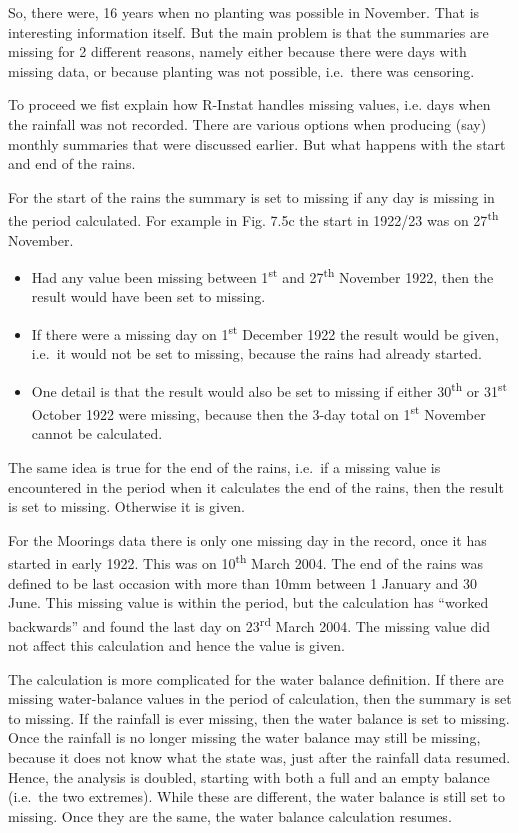 \documentclass[
  letterpaper,
  DIV=11,
  numbers=noendperiod]{scrreprt}
\begin{document}
So, there were, 16 years when no planting was possible in November. That
is interesting information itself. But the main problem is that the
summaries are missing for 2 different reasons, namely either because
there were days with missing data, or because planting was not possible,
i.e.~there was censoring.

To proceed we fist explain how R-Instat handles missing values, i.e.
days when the rainfall was not recorded. There are various options when
producing (say) monthly summaries that were discussed earlier. But what
happens with the start and end of the rains.

For the start of the rains the summary is set to missing if any day is
missing in the period calculated. For example in Fig. 7.5c the start in
1922/23 was on 27\textsuperscript{th} November.

\begin{itemize}
\item
  Had any value been missing between 1\textsuperscript{st} and
  27\textsuperscript{th} November 1922, then the result would have been
  set to missing.
\item
  If there were a missing day on 1\textsuperscript{st} December 1922 the
  result would be given, i.e.~it would not be set to missing, because
  the rains had already started.
\item
  One detail is that the result would also be set to missing if either
  30\textsuperscript{th} or 31\textsuperscript{st} October 1922 were
  missing, because then the 3-day total on 1\textsuperscript{st}
  November cannot be calculated.
\end{itemize}

The same idea is true for the end of the rains, i.e.~if a missing value
is encountered in the period when it calculates the end of the rains,
then the result is set to missing. Otherwise it is given.

For the Moorings data there is only one missing day in the record, once
it has started in early 1922. This was on 10\textsuperscript{th} March
2004. The end of the rains was defined to be last occasion with more
than 10mm between 1 January and 30 June. This missing value is within
the period, but the calculation has ``worked backwards'' and found the
last day on 23\textsuperscript{rd} March 2004. The missing value did not
affect this calculation and hence the value is given.

The calculation is more complicated for the water balance definition. If
there are missing water-balance values in the period of calculation,
then the summary is set to missing. If the rainfall is ever missing,
then the water balance is set to missing. Once the rainfall is no longer
missing the water balance may still be missing, because it does not know
what the state was, just after the rainfall data resumed. Hence, the
analysis is doubled, starting with both a full and an empty balance
(i.e.~the two extremes). While these are different, the water balance is
still set to missing. Once they are the same, the water balance
calculation resumes.
\end{document}

